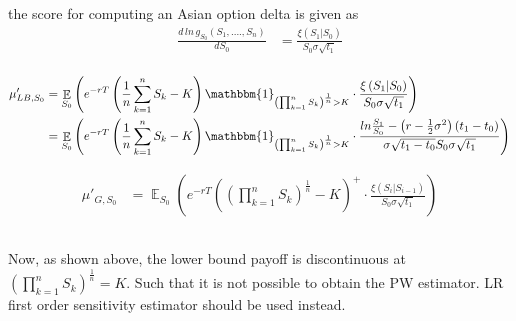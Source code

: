 \documentclass[10pt,oneside,a4paper]{article}
\DeclareMathOperator{\E}{\mathbb{E}}
\begin{document}
\begin{flushleft}
the score for computing an Asian option delta is given as
\begin{align*}
\frac{d \, ln \, g_{S_{0}} (S_1, ...., S_n)}{d S_0} &= \frac{\xi\left(S_1|S_{0}\right)}{S_0 \sigma \sqrt{t_1}}\\
\end{align*}

\begin{align*}
\mu'_{LB, S_0} &= \E _{S_0}\left(e^{-rT}\left( \frac{1}{n}\sum_{k=1}^{n}S_k - K\right)\mathbbm{1}_{\left( \prod_{k=1}^{n}S_k\right) ^{\frac{1}{n} }>K} \cdot \frac{\xi\left(S_1|S_{0}\right)}{S_0 \sigma \sqrt{t_1}} \right)\\
&= \E _{S_0}\left(e^{-rT}\left( \frac{1}{n}\sum_{k=1}^{n}S_k - K\right)\mathbbm{1}_{\left( \prod_{k=1}^{n}S_k\right) ^{\frac{1}{n} }>K} \cdot \frac{ln\frac{S_1}{S_0} - \left(r - \frac{1}{2}\sigma^2\right)\left(t_1 - t_0\right)}{\sigma\sqrt{t_1 - t_0}S_0\sigma\sqrt{t_1}}\right)
\end{align*}

\vspace{5mm}

\begin{align*}
\mu'_{G, S_0} &= \E _{S_0}\left(e^{-rT}\left(\left(\prod_{k=1}^{n}S_k\right) ^{\frac{1}{n}} - K\right)^{+} \cdot \frac{\xi\left(S_i|S_{i-1}\right)}{S_0 \sigma \sqrt{t_1}} \right)\\
\end{align*}
\subsubsection{}
Now, as shown above, the lower bound payoff is discontinuous at $\left( \prod_{k=1}^{n}S_k\right) ^{\frac{1}{n}} =K$. Such that it is not possible to obtain the PW estimator. LR first order sensitivity estimator should be used instead.


\end{flushleft}
\end{document}
